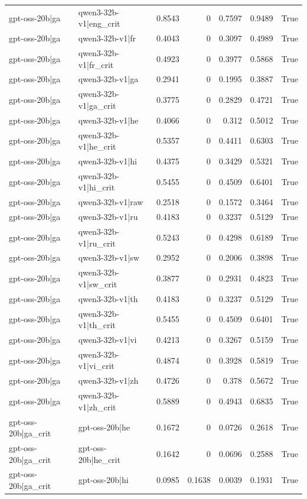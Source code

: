 \begin{table}
\begin{tabular}{l l r r r r l}
gpt-oss-20b|ga & qwen3-32b-v1|eng_crit & 0.8543 & 0 & 0.7597 & 0.9489 & True \\
gpt-oss-20b|ga & qwen3-32b-v1|fr & 0.4043 & 0 & 0.3097 & 0.4989 & True \\
gpt-oss-20b|ga & qwen3-32b-v1|fr_crit & 0.4923 & 0 & 0.3977 & 0.5868 & True \\
gpt-oss-20b|ga & qwen3-32b-v1|ga & 0.2941 & 0 & 0.1995 & 0.3887 & True \\
gpt-oss-20b|ga & qwen3-32b-v1|ga_crit & 0.3775 & 0 & 0.2829 & 0.4721 & True \\
gpt-oss-20b|ga & qwen3-32b-v1|he & 0.4066 & 0 & 0.312 & 0.5012 & True \\
gpt-oss-20b|ga & qwen3-32b-v1|he_crit & 0.5357 & 0 & 0.4411 & 0.6303 & True \\
gpt-oss-20b|ga & qwen3-32b-v1|hi & 0.4375 & 0 & 0.3429 & 0.5321 & True \\
gpt-oss-20b|ga & qwen3-32b-v1|hi_crit & 0.5455 & 0 & 0.4509 & 0.6401 & True \\
gpt-oss-20b|ga & qwen3-32b-v1|raw & 0.2518 & 0 & 0.1572 & 0.3464 & True \\
gpt-oss-20b|ga & qwen3-32b-v1|ru & 0.4183 & 0 & 0.3237 & 0.5129 & True \\
gpt-oss-20b|ga & qwen3-32b-v1|ru_crit & 0.5243 & 0 & 0.4298 & 0.6189 & True \\
gpt-oss-20b|ga & qwen3-32b-v1|sw & 0.2952 & 0 & 0.2006 & 0.3898 & True \\
gpt-oss-20b|ga & qwen3-32b-v1|sw_crit & 0.3877 & 0 & 0.2931 & 0.4823 & True \\
gpt-oss-20b|ga & qwen3-32b-v1|th & 0.4183 & 0 & 0.3237 & 0.5129 & True \\
gpt-oss-20b|ga & qwen3-32b-v1|th_crit & 0.5455 & 0 & 0.4509 & 0.6401 & True \\
gpt-oss-20b|ga & qwen3-32b-v1|vi & 0.4213 & 0 & 0.3267 & 0.5159 & True \\
gpt-oss-20b|ga & qwen3-32b-v1|vi_crit & 0.4874 & 0 & 0.3928 & 0.5819 & True \\
gpt-oss-20b|ga & qwen3-32b-v1|zh & 0.4726 & 0 & 0.378 & 0.5672 & True \\
gpt-oss-20b|ga & qwen3-32b-v1|zh_crit & 0.5889 & 0 & 0.4943 & 0.6835 & True \\
gpt-oss-20b|ga_crit & gpt-oss-20b|he & 0.1672 & 0 & 0.0726 & 0.2618 & True \\
gpt-oss-20b|ga_crit & gpt-oss-20b|he_crit & 0.1642 & 0 & 0.0696 & 0.2588 & True \\
gpt-oss-20b|ga_crit & gpt-oss-20b|hi & 0.0985 & 0.1638 & 0.0039 & 0.1931 & True \\

\end{tabular}
\end{table}

